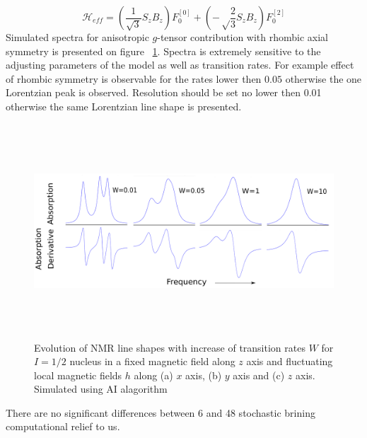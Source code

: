 \begin{equation}
\mathcal{H}_{eff}=(\frac{1}{\sqrt{3}}S_zB_z)F_0^{[0]}+(-\sqrt\frac{2}{3}S_zB_z)F_0^{[2]}
\end{equation}
Simulated spectra for anisotropic $g$-tensor contribution with rhombic axial symmetry is presented on figure ~\ref{figure:gten1}. Spectra is extremely sensitive to the adjusting parameters of the model as well as transition rates. For example effect of rhombic symmetry is observable for the rates lower then $0.05$ otherwise the one Lorentzian peak is observed. Resolution should be set no lower then 0.01 otherwise the same Lorentzian line shape is presented. 
\begin{figure}[h!]
\centering
\includegraphics[height=8cm,width=1\textwidth]{figures/chap2/gtenanisat1.png}
\caption{Evolution of NMR line shapes with increase of transition rates $W$ for $I=1/2$ nucleus in a fixed magnetic field along $z$ axis and fluctuating local magnetic fields $h$ along (a) $x$ axis, (b) $y$ axis and (c) $z$ axis. Simulated using AI alagorithm}
\label{figure:gten1}
\end{figure}
There are no significant differences between 6 and 48 stochastic brining computational relief to us. 
